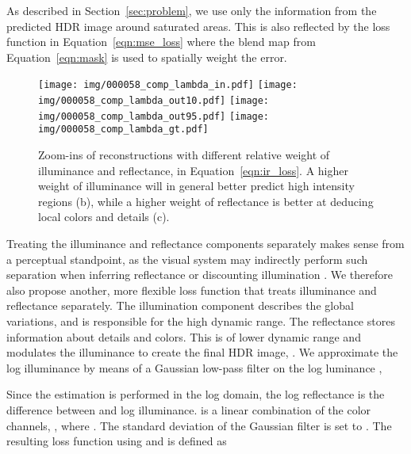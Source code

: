 \documentclass[acmtog]{acmart}
\newcommand{\eqnref}[1]{Equation~\ref{eqn:#1}}
\newcommand{\secref}[1]{Section~\ref{sec:#1}}
\newcommand\belowfigspace{-2pt}
\begin{document}
As described in \secref{problem}, we use only the information from the predicted HDR image  around saturated areas. This is also reflected by the loss function in \eqnref{mse_loss} where the blend map  from \eqnref{mask} is used to spatially weight the error.

\begin{figure}[t]
	\vspace{5pt}
	\newcommand\ww{0.116}
	\centering
	\texttt{[image: img/000058\_comp\_lambda\_in.pdf]}
	\texttt{[image: img/000058\_comp\_lambda\_out10.pdf]}
	\texttt{[image: img/000058\_comp\_lambda\_out95.pdf]}
	\texttt{[image: img/000058\_comp\_lambda\_gt.pdf]}\\
	\vspace{-2pt}
	\vspace{-10pt}
	\caption{\label{fig:lambda} Zoom-ins of reconstructions with different relative weight of illuminance and reflectance,  in \eqnref{ir_loss}. A higher weight of illuminance will in general better predict high intensity regions (b), while a higher weight of reflectance is better at deducing local colors and details (c).}
	\vspace{\belowfigspace}
\end{figure}

Treating the illuminance and reflectance components separately makes sense from a perceptual standpoint, as the visual system may indirectly perform such separation when inferring reflectance or discounting illumination \cite{Gilchrist1984}. 
We therefore also propose another, more flexible loss function that treats illuminance and reflectance separately.
The illumination component  describes the global variations, and is responsible for the high dynamic range. The reflectance  stores information about details and colors. This is of lower dynamic range and modulates the illuminance to create the final HDR image, . We approximate the log illuminance by means of a Gaussian low-pass filter  on the log luminance ,

Since the estimation is performed in the log domain, the log reflectance is the difference between  and log illuminance.
 is a linear combination of the color channels, , where . The standard deviation of the Gaussian filter is set to . The resulting loss function using  and  is defined as
\end{document}
